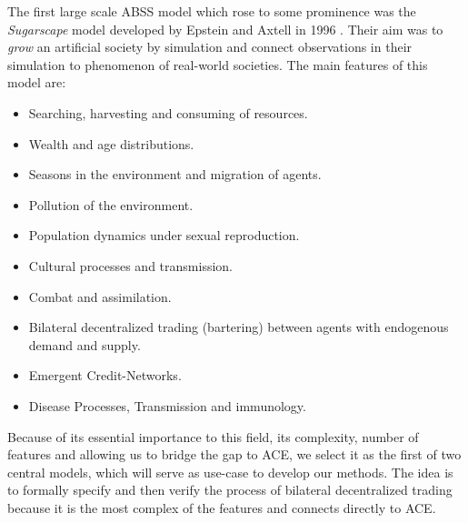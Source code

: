
The first large scale ABSS model which rose to some prominence was the \textit{Sugarscape} model developed by Epstein and Axtell in 1996 \cite{epstein_growing_1996}. Their aim was to \textit{grow} an artificial society by simulation and connect observations in their simulation to phenomenon of real-world societies. The main features of this model are:

\begin{itemize}
	\item Searching, harvesting and consuming of resources.
	\item Wealth and age distributions.
	\item Seasons in the environment and migration of agents.
	\item Pollution of the environment.
	\item Population dynamics under sexual reproduction.
	\item Cultural processes and transmission.
	\item Combat and assimilation.
	\item Bilateral decentralized trading (bartering) between agents with endogenous demand and supply.
	\item Emergent Credit-Networks.
	\item Disease Processes, Transmission and immunology.
\end{itemize}

Because of its essential importance to this field, its complexity, number of features and allowing us to bridge the gap to ACE, we select it as the first of two central models, which will serve as use-case to develop our methods. The idea is to formally specify and then verify the process of bilateral decentralized trading because it is the most complex of the features and connects directly to ACE.

